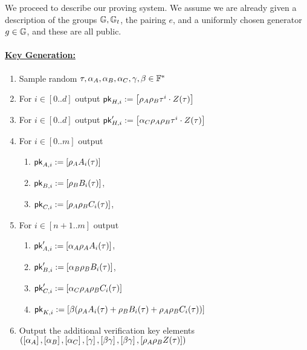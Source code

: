 \documentclass[11pt]{article}
\numberwithin{figure}{section} %
\begin{document}
We proceed to describe our proving system.
We assume we are already given a description of the groups ${\mathbb G},{\mathbb G}_t$, the pairing $e$, and a uniformly chosen generator 
$g\in {\mathbb G}$, and these are all public.
\paragraph{\underline{Key Generation:}}

\begin{enumerate}
 \item Sample random $\tau,\alpha_A,\alpha_B,\alpha_C,\gamma,\beta\in \mathbb F^*$
 \item For $i\in [0..d]$ output $\mathsf{pk}_{H,i}:= \left[\rho_A\rho_B \tau^i\cdot Z(\tau)\right]$
\item For $i\in [0..d]$ output $\mathsf{pk}'_{H,i}:= \left[\alpha_C \rho_A\rho_B \tau^i\cdot Z(\tau)\right]$
 \item For $i\in [0..m]$ output
 
 \begin{enumerate}
  \item $\mathsf{pk}_{A,i}:= \left[\rho_A A_i(\tau)\right]$
  
\item $\mathsf{pk}_{B,i}:=\left[\rho_B B_i(\tau)\right]$,
\item $\mathsf{pk}_{C,i}:= \left[\rho_A\rho_B C_i(\tau)\right]$,

\end{enumerate}
 \item For $i\in [n+1..m]$ output
\begin{enumerate}
\item  $\mathsf{pk}'_{A,i}:=\left[\alpha_A\rho_A A_i(\tau)\right]$,
\item $\mathsf{pk}'_{B,i}:= \left[\alpha_B\rho_B B_i(\tau)\right]$,
\item $\mathsf{pk}'_{C,i}:= \left[\alpha_C \rho_A\rho_B C_i(\tau)\right]$
\item $\mathsf{pk}_{K,i}:= \left[\beta(\rho_A A_i(\tau) + \rho_B B_i(\tau) + \rho_A\rho_B C_i(\tau))\right]$ 


\end{enumerate}



\item Output the additional verification key elements $(\left[\alpha_A\right],\left[\alpha_B\right],\left[\alpha_C\right],\left[\gamma\right],\left[\beta\gamma\right],\left[\beta\gamma\right],\left[\rho_A\rho_B Z(\tau)\right])$
 \end{enumerate}
\end{document}
